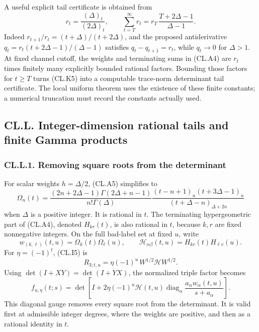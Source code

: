 \documentclass[a4paper,11pt]{article}
\numberwithin{equation}{section}
\begin{document}
A useful explicit tail certificate is obtained from \[
r_t=\frac{(\Delta)_t}{(2\Delta)_t},\qquad
\sum_{t=T}^{\infty}r_t
=r_T\,\frac{T+2\Delta-1}{\Delta-1}.
\tag{CL.K5}
\] Indeed \(r_{t+1}/r_t=(t+\Delta)/(t+2\Delta)\), and the proposed antiderivative \(q_t=r_t(t+2\Delta-1)/(\Delta-1)\) satisfies \(q_t-q_{t+1}=r_t\), while \(q_t\to0\) for \(\Delta>1\). At fixed channel cutoff, the weights and terminating sums in (CL.A4) are \(r_t\) times finitely many explicitly bounded rational factors. Bounding those factors for \(t\geq T\) turns (CL.K5) into a computable trace-norm determinant tail certificate. The local uniform theorem uses the existence of these finite constants; a numerical truncation must record the constants actually used.

\hypertarget{cl.l.-integer-dimension-rational-tails-and-finite-gamma-products}{%
\subsection{CL.L. Integer-dimension rational tails and finite Gamma products}\label{cl.l.-integer-dimension-rational-tails-and-finite-gamma-products}}

\hypertarget{cl.l.1.-removing-square-roots-from-the-determinant}{%
\subsubsection{CL.L.1. Removing square roots from the determinant}\label{cl.l.1.-removing-square-roots-from-the-determinant}}

For scalar weights \(h=\Delta/2\), (CL.A5) simplifies to \[
\Omega_n(t)=
\frac{(2n+2\Delta-1)\Gamma(2\Delta+n-1)}{n!\Gamma(\Delta)}
\frac{(t-n+1)_n(t+3\Delta-1)_n}
{(t+\Delta-n)_{\Delta+2n}}
\tag{CL.L1}
\] when \(\Delta\) is a positive integer. It is rational in \(t\). The terminating hypergeometric part of (CL.A4), denoted \(H_{kr}(t)\), is also rational in \(t\), because \(k,r\) are fixed nonnegative integers. On the full bad-label set at fixed \(u\), write \[
w_{(k,\ell)}(t,u)=\Omega_k(t)\Omega_\ell(u),\qquad
\mathcal H_{\alpha\beta}(t,u)=H_{kr}(t)H_{\ell v}(u).
\] For \(\eta=(-1)^t\), (CL.I5) is \[
R_{3;t,u}=\eta(-1)^u\,W^{1/2}\mathcal H W^{1/2}.
\] Using \(\det(I+XY)=\det(I+YX)\), the normalized triple factor becomes \[
f_{u,\eta}(t;s)=
\det\!\left[
I+2\eta(-1)^u\mathcal H(t,u)
\operatorname{diag}_\alpha
\frac{a_\alpha w_\alpha(t,u)}{s+a_\alpha}
\right].
\tag{CL.L2}
\] This diagonal gauge removes every square root from the determinant. It is valid first at admissible integer degrees, where the weights are positive, and then as a rational identity in \(t\).
\end{document}
